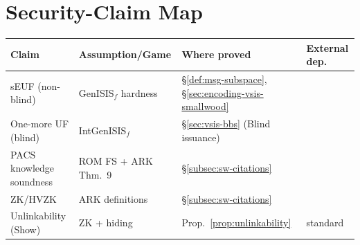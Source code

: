 \section{Security-Claim Map}\label{sec:security-claim-map}
\begin{center}
\begin{tabular}{@{}l l l l@{}}
\toprule
Claim & Assumption/Game & Where proved & External dep.\\
\midrule
sEUF (non-blind) & GenISIS$_f$ hardness & \S\ref{def:msg-subspace}, \S\ref{sec:encoding-vsis-smallwood} & \cite[Thm.~5]{cryptoeprint:2025/356} \\
One-more UF (blind) & IntGenISIS$_f$ & \S\ref{sec:vsis-bbs} (Blind issuance) & \cite[Thm.~6, Fig.~1]{cryptoeprint:2025/356} \\
PACS knowledge soundness & ROM FS + ARK Thm.~9 & \S\ref{subsec:sw-citations} & \cite[Thm.~9]{cryptoeprint:2025/1085} \\
ZK/HVZK & ARK definitions & \S\ref{subsec:sw-citations} & \cite[\S5]{cryptoeprint:2025/1085} \\
Unlinkability (Show) & ZK + hiding & Prop.~\ref{prop:unlinkability} & standard \\
\bottomrule
\end{tabular}
\end{center}
